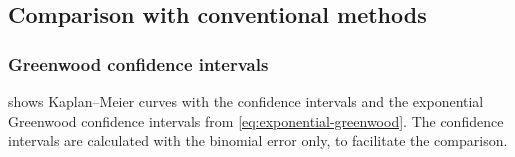 \documentclass[article]{jss}
\newcommand{\KM}{Kaplan--Meier} %
\begin{document}
\subsection{Comparison with conventional methods}\label{sec:compare-to-conventional}

\subsubsection{Greenwood confidence intervals}\label{sec:compare-to-greenwood}

 shows \KM{} curves with the  confidence intervals and the exponential Greenwood confidence intervals from \cref{eq:exponential-greenwood}.  The  confidence intervals are calculated with the binomial error only, to facilitate the comparison.
\end{document}
